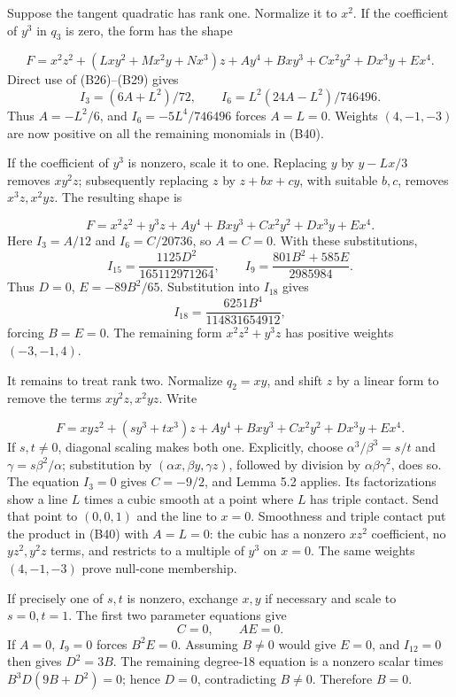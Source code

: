 \documentclass[
]{article}
\begin{document}
Suppose the tangent quadratic has rank one. Normalize it to \(x^2\). If
the coefficient of \(y^3\) in \(q_3\) is zero, the form has the shape
\protect{}\label{equation-B40}{}

\[
F=x^2z^2+(Lxy^2+Mx^2y+Nx^3)z
+Ay^4+Bxy^3+Cx^2y^2+Dx^3y+Ex^4.
\tag{B40}
\] Direct use of (B26)--(B29) gives \[
I_3=(6A+L^2)/72,\qquad
I_6=L^2(24A-L^2)/746496.
\] Thus \(A=-L^2/6\), and \(I_6=-5L^4/746496\) forces \(A=L=0\). Weights
\((4,-1,-3)\) are now positive on all the remaining monomials in (B40).

If the coefficient of \(y^3\) is nonzero, scale it to one. Replacing
\(y\) by \(y-Lx/3\) removes \(xy^2z\); subsequently replacing \(z\) by
\(z+bx+cy\), with suitable \(b,c\), removes \(x^3z,x^2yz\). The
resulting shape is \protect{}\label{equation-B41}{}

\[
F=x^2z^2+y^3z+Ay^4+Bxy^3+Cx^2y^2+Dx^3y+Ex^4.
\tag{B41}
\] Here \(I_3=A/12\) and \(I_6=C/20736\), so \(A=C=0\). With these
substitutions, \[
I_{15}=\frac{1125D^2}{165112971264},\qquad
I_9=\frac{801B^2+585E}{2985984}.
\] Thus \(D=0\), \(E=-89B^2/65\). Substitution into \(I_{18}\) gives \[
I_{18}=\frac{6251B^4}{114831654912},
\] forcing \(B=E=0\). The remaining form \(x^2z^2+y^3z\) has positive
weights \((-3,-1,4)\).

It remains to treat rank two. Normalize \(q_2=xy\), and shift \(z\) by a
linear form to remove the terms \(xy^2z,x^2yz\). Write
\protect{}\label{equation-B42}{}

\[
F=xyz^2+(sy^3+tx^3)z+Ay^4+Bxy^3+Cx^2y^2+Dx^3y+Ex^4.
\tag{B42}
\] If \(s,t\ne0\), diagonal scaling makes both one. Explicitly, choose
\(\alpha^3/\beta^3=s/t\) and \(\gamma=s\beta^2/\alpha\); substitution by
\((\alpha x,\beta y,\gamma z)\), followed by division by
\(\alpha\beta\gamma^2\), does so. The equation \(I_3=0\) gives
\(C=-9/2\), and Lemma 5.2 applies. Its factorizations show a line \(L\)
times a cubic smooth at a point where \(L\) has triple contact. Send
that point to \((0,0,1)\) and the line to \(x=0\). Smoothness and triple
contact put the product in (B40) with \(A=L=0\): the cubic has a nonzero
\(xz^2\) coefficient, no \(yz^2,y^2z\) terms, and restricts to a
multiple of \(y^3\) on \(x=0\). The same weights \((4,-1,-3)\) prove
null-cone membership.

If precisely one of \(s,t\) is nonzero, exchange \(x,y\) if necessary
and scale to \(s=0,t=1\). The first two parameter equations give \[
C=0,\qquad AE=0.
\] If \(A=0\), \(I_9=0\) forces \(B^2E=0\). Assuming \(B\ne0\) would
give \(E=0\), and \(I_{12}=0\) then gives \(D^2=3B\). The remaining
degree-18 equation is a nonzero scalar times \(B^3D(9B+D^2)=0\); hence
\(D=0\), contradicting \(B\ne0\). Therefore \(B=0\).
\end{document}
